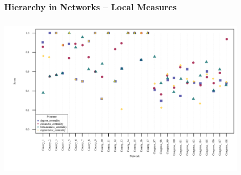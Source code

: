 \documentclass{beamer}
\newenvironment{changemargin}[2]{%
	\begin{list}{}{%
			\setlength{\topsep}{0pt}%
			\setlength{\leftmargin}{#1}%
			\setlength{\rightmargin}{#2}%
			\setlength{\listparindent}{\parindent}%
			\setlength{\itemindent}{\parindent}%
			\setlength{\parsep}{\parskip}%
		}%
		\item[]}{\end{list}}
\begin{document}
\begin{frame}\frametitle{Hierarchy in Networks -- Local Measures}
	\begin{changemargin}{-2cm}{ -2cm}
		\centering
		\includegraphics[width=12cm, height=8cm]{images/Measure_Scores.pdf}
	\end{changemargin}
\end{frame}
\end{document}
